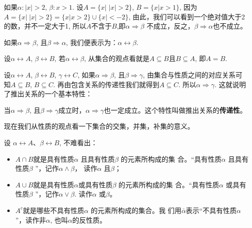如果$\alpha :|x|>2$, $\beta :x>1$. 设$A=\{x|\; |x|>2\}$, $B=\{ x| x>1\}$, 因为$A=\{ x|\; |x|>2\}=\{x|x>2\}\cup\{x|<-2\}$, 由此，我们可以看到一个绝对值大于2
的数，并不一定大于1, 所以$A$不含于$B$,即$\alpha \Rightarrow\beta$ 不成立，反之，$\beta \Rightarrow \alpha$也不成立。

如果$\alpha \Rightarrow\beta$, 且$\beta \Rightarrow\alpha$, 我们便表示为：$\alpha\longleftrightarrow \beta$.

设$\alpha \longleftrightarrow A$, $\beta \longleftrightarrow B$, 若$\alpha \longleftrightarrow\beta$, 从集合的观点看就是$A\subseteq B$且$B\subseteq A$, 即$A=B$.

设$\alpha \longleftrightarrow A$, $\beta \longleftrightarrow B$, $\gamma\longleftrightarrow C$, 如果$\alpha \Rightarrow\beta$, 且$\beta \Rightarrow\gamma$, 由集合与性质之间的对应关系可知$A\subseteq B$, $B\subseteq C$. 再由包含关系的传递性我们就得到$A\subseteq C$. 所以$\alpha \Rightarrow\gamma$. 这就说明了推出关系的一个基本特性：

当$\alpha \Rightarrow\beta$, 且$\beta \Rightarrow\gamma$成立时，$\alpha \Rightarrow\gamma$也一定成立。这个特性叫做推出关系的\textbf{传递性}。

现在我们从性质的观点看一下集合的交集，并集，补集的意义。

设 $\alpha \longleftrightarrow A$、$\beta\longleftrightarrow B$, 不难看出：
\begin{itemize}
    \item $A\cap B$就是具有性质$\alpha$ 且具有性质$\beta$ 的元素所构成的集
合。“具有性质$\alpha$ 且具有性质$\beta$ ”，记作$\alpha \wedge\beta$， 读作$\alpha$ 且$\beta$；
\item  $A\cup B$就是具有性质$\alpha$或具有性质$\beta$ 的元素所构成的集
合。“具有性质$\alpha$ 或具有性质$\beta$ ”，记作$\alpha \vee\beta$. 读作$\alpha$ 或$\beta$。 
\item $A^c$就是哪些不具有性质$\alpha$ 的元素所构成的集合。我
们用$\bar{\alpha}$表示“不具有性质$\alpha$”，读作非$\alpha$, 也叫$\alpha$的反性质。
\end{itemize}

\begin{figure}[htp]
    \centering
{}    
    \caption{}
\end{figure}

